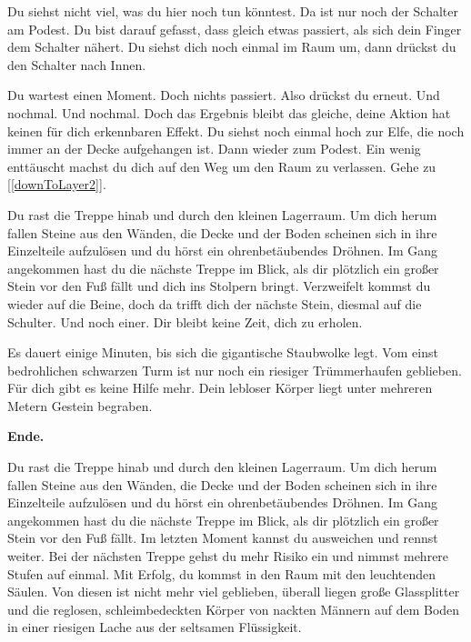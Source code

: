 
Du siehst nicht viel, was du hier noch tun könntest. Da ist nur noch der Schalter am Podest. Du bist darauf gefasst, dass gleich etwas passiert, als sich dein Finger dem Schalter nähert. Du siehst dich noch einmal im Raum um, dann drückst du den Schalter nach Innen.

Du wartest einen Moment. Doch nichts passiert. Also drückst du erneut. Und nochmal. Und nochmal. Doch das Ergebnis bleibt das gleiche, deine Aktion hat keinen für dich erkennbaren Effekt. Du siehst noch einmal hoch zur Elfe, die noch immer an der Decke aufgehangen ist. Dann wieder zum Podest. Ein wenig enttäuscht machst du dich auf den Weg um den Raum zu verlassen. Gehe zu [\ref{downToLayer2}].


Du rast die Treppe hinab und durch den kleinen Lagerraum. Um dich herum fallen Steine aus den Wänden, die Decke und der Boden scheinen sich in ihre Einzelteile aufzulösen und du hörst ein ohrenbetäubendes Dröhnen. Im Gang angekommen hast du die nächste Treppe im Blick, als dir plötzlich ein großer Stein vor den Fuß fällt und dich ins Stolpern bringt. Verzweifelt kommst du wieder auf die Beine, doch da trifft dich der nächste Stein, diesmal auf die Schulter. Und noch einer. Dir bleibt keine Zeit, dich zu erholen.

Es dauert einige Minuten, bis sich die gigantische Staubwolke legt. Vom einst bedrohlichen schwarzen Turm ist nur noch ein riesiger Trümmerhaufen geblieben. Für dich gibt es keine Hilfe mehr. Dein lebloser Körper liegt unter mehreren Metern Gestein begraben.

\textbf{Ende.}


Du rast die Treppe hinab und durch den kleinen Lagerraum. Um dich herum fallen Steine aus den Wänden, die Decke und der Boden scheinen sich in ihre Einzelteile aufzulösen und du hörst ein ohrenbetäubendes Dröhnen. Im Gang angekommen hast du die nächste Treppe im Blick, als dir plötzlich ein großer Stein vor den Fuß fällt. Im letzten Moment kannst du ausweichen und rennst weiter. Bei der nächsten Treppe gehst du mehr Risiko ein und nimmst mehrere Stufen auf einmal. Mit Erfolg, du kommst in den Raum mit den leuchtenden Säulen. Von diesen ist nicht mehr viel geblieben, überall liegen große Glassplitter und die reglosen, schleimbedeckten Körper von nackten Männern auf dem Boden in einer riesigen Lache aus der seltsamen Flüssigkeit.

